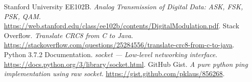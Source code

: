 \documentclass[11pt, conference]{IEEEtran}
\begin{document}
\clearpage

\begin{thebibliography}{1}
 Stanford University EE102B. \emph{Analog Transmission of Digital Data: ASK, FSK, PSK, QAM}. \url{https://web.stanford.edu/class/ee102b/contents/DigitalModulation.pdf}.
 Stack Overflow. \emph{Translate CRC8 from C to Java}. \url{https://stackoverflow.com/questions/25284556/translate-crc8-from-c-to-java}.
 Python 3.7.2 Documentation. \emph{\textsf{socket} --- Low-level networking interface}. \url{https://docs.python.org/3/library/socket.html}.
 GitHub Gist. \emph{A pure python ping implementation using raw socket}. \url{https://gist.github.com/pklaus/856268}.
\end{thebibliography}
\end{document}
